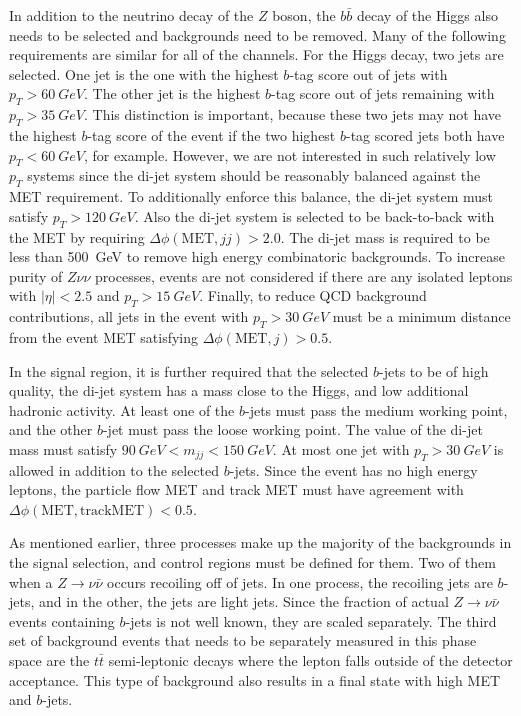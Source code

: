 In addition to the neutrino decay of the $Z$ boson, the $b\bar{b}$ decay
of the Higgs also needs to be selected and backgrounds need to be removed.
Many of the following requirements are similar for all of the channels.
For the Higgs decay, two jets are selected.
One jet is the one with the highest $b$-tag score out of jets with $p_T > \SI{60}{GeV}$.
The other jet is the highest $b$-tag score out of jets remaining with $p_T > \SI{35}{GeV}$.
This distinction is important, because these two jets may not have the highest
$b$-tag score of the event if the two highest $b$-tag scored jets both have
$p_T < \SI{60}{GeV}$, for example.
However, we are not interested in such relatively low $p_T$ systems since
the di-jet system should be reasonably balanced against the MET requirement.
To additionally enforce this balance, the di-jet system must satisfy $p_T > \SI{120}{GeV}$.
Also the di-jet system is selected to be back-to-back with the MET
by requiring $\Delta\phi(\mathrm{MET}, jj) > 2.0$.
The di-jet mass is required to be less than \SI{500}{GeV} to remove high energy
combinatoric backgrounds.
To increase purity of $Z\nu\nu$ processes,
events are not considered if there are any isolated leptons
with $|\eta| < 2.5$ and $p_T > \SI{15}{GeV}$.
Finally, to reduce QCD background contributions,
all jets in the event with $p_T > \SI{30}{GeV}$
must be a minimum distance from the event MET satisfying
$\Delta \phi(\mathrm{MET}, j) > 0.5$.

In the signal region, it is further required that
the selected $b$-jets to be of high quality,
the di-jet system has a mass close to the Higgs,
and low additional hadronic activity.
At least one of the $b$-jets must pass the medium working point,
and the other $b$-jet must pass the loose working point.
The value of the di-jet mass must satisfy $\SI{90}{GeV} < m_{jj} < \SI{150}{GeV}$.
At most one jet with $p_T > \SI{30}{GeV}$ is allowed
in addition to the selected $b$-jets.
Since the event has no high energy leptons,
the particle flow MET and track MET must have agreement with
$\Delta \phi(\mathrm{MET}, \mathrm{track MET}) < 0.5$.

As mentioned earlier, three processes make up the majority of the backgrounds
in the signal selection, and control regions must be defined for them.
Two of them when a $Z \rightarrow \nu\bar{\nu}$ occurs recoiling off of jets.
In one process, the recoiling jets are $b$-jets, and in the other, the jets are light jets.
Since the fraction of actual $Z \rightarrow \nu\bar{\nu}$ events
containing $b$-jets is not well known, they are scaled separately.
The third set of background events that needs to be separately measured in this phase space
are the $t\bar{t}$ semi-leptonic decays
where the lepton falls outside of the detector acceptance.
This type of background also results in a final state with high MET and $b$-jets.

